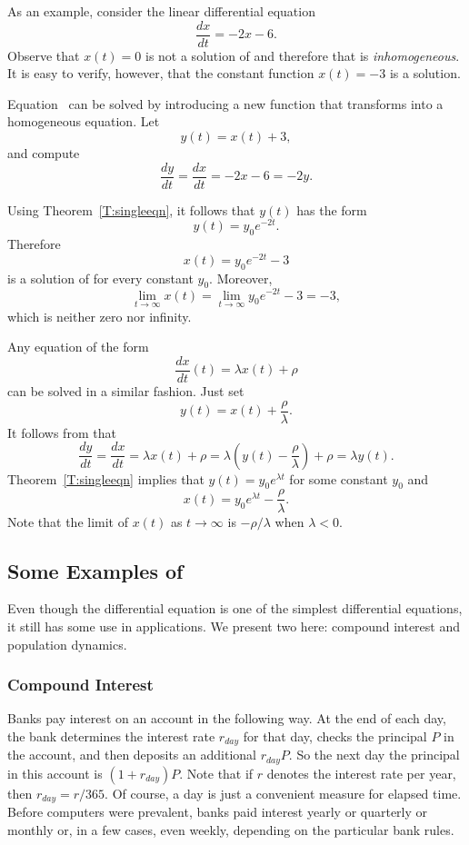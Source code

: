 As an example, consider the linear differential equation
\begin{equation} \label{E:ivp2}
\frac{dx}{dt} = -2x-6.
\end{equation}
Observe that $x(t)=0$ is not a solution of  and therefore
that  is {\em inhomogeneous}.  It is easy to verify, however, 
that the constant function $x(t)=-3$ is a solution.

Equation~ can be solved by introducing a new function that 
transforms  into a homogeneous equation.  Let
\[
y(t) = x(t) + 3,
\]
and compute
\[
\frac{dy}{dt} = \frac{dx}{dt} = -2x-6 = -2y.
\]

Using Theorem~\ref{T:singleeqn}, it follows that $y(t)$ has the form
\[
y(t) = y_0e^{-2t}.
\]
Therefore
\[
x(t) =  y_0e^{-2t}-3
\]
is a solution of  for every constant $y_0$.  Moreover, 
\[
\lim_{t\to\infty} x(t) = \lim_{t\to\infty} y_0e^{-2t} -3=-3,
\]
which is neither zero nor infinity.

Any equation of the form
\begin{equation} \label{ivp2}
\frac{dx}{dt}(t)  = \lambda x(t) +\rho
\end{equation}
can be solved in a similar fashion.  Just set 
\[
y(t) = x(t) + \frac{\rho}{\lambda}.
\]
It follows from  that
\[
\frac{dy}{dt} = \frac{dx}{dt} = \lambda x(t) +\rho =
\lambda\left( y(t)-\frac{\rho}{\lambda}\right) +\rho = \lambda y(t).
\]
Theorem~\ref{T:singleeqn} implies that $y(t) = y_0e^{\lambda t}$ for some 
constant $y_0$ and
\[
x(t) = y_0e^{\lambda t} - \frac{\rho}{\lambda}.
\]
Note that the limit of $x(t)$ as $t\to\infty$ is $-\rho/\lambda$ when 
$\lambda<0$.



\subsection*{Some Examples of \protect{}}

Even though the differential equation  is one of the
simplest differential equations, it still has some use in applications.
We present two here: compound interest and population dynamics.

\subsubsection*{Compound Interest} 

Banks pay interest on an account in the following way.  At the
end of each day, the bank determines the interest rate $r_{day}$ for
that day, checks the principal $P$ in the account, and then
deposits an additional $r_{day}P$.  So the next day the principal in
this account is $(1+r_{day})P$.  Note that if $r$ denotes the
interest rate per year, then $r_{day} = r/365$.  Of course, a day
is just a convenient measure for elapsed time.  Before computers
were prevalent, banks paid interest yearly or quarterly or monthly
or, in a few cases, even weekly, depending on the particular bank rules.

